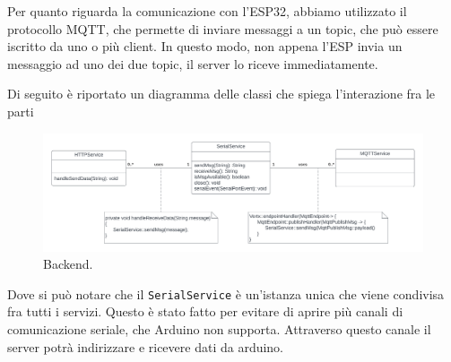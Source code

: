 \documentclass[a4paper,12pt]{report}
\begin{document}
Per quanto riguarda la comunicazione con l'ESP32, abbiamo utilizzato il protocollo MQTT, che permette di inviare messaggi a un topic, che può essere iscritto da uno o più client. In questo modo, non appena l'ESP invia un messaggio ad uno dei due topic, il server lo riceve immediatamente.

Di seguito è riportato un diagramma delle classi che spiega l'interazione fra le parti
\begin{figure}[H]
    \centering
    \includegraphics[width=\textwidth]{img/Classi - backend.png}
    \caption{Backend.}
    \label{fig:backend}
\end{figure}

Dove si può notare che il \texttt{SerialService} è un'istanza unica che viene condivisa fra tutti i servizi. Questo è stato fatto per evitare di aprire più canali di comunicazione seriale, che Arduino non supporta. Attraverso questo canale il server potrà indirizzare e ricevere dati da arduino. 
\end{document}
